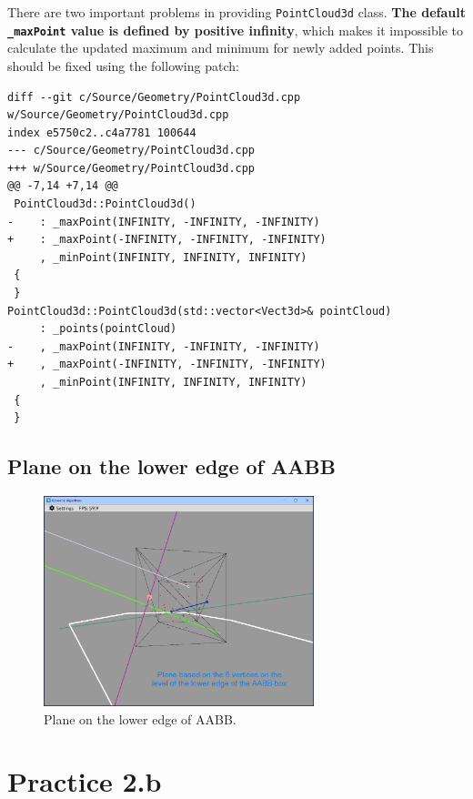 \documentclass[12pt,a4paper,english]{article}
\begin{document}
There are two important problems in providing \lstinline{PointCloud3d} class. \textbf{The default \lstinline{_maxPoint} value is defined by positive infinity}, which makes it impossible to calculate the updated maximum and minimum for newly added points. This should be fixed using the following patch:

\begin{verbatim}
diff --git c/Source/Geometry/PointCloud3d.cpp w/Source/Geometry/PointCloud3d.cpp
index e5750c2..c4a7781 100644
--- c/Source/Geometry/PointCloud3d.cpp
+++ w/Source/Geometry/PointCloud3d.cpp
@@ -7,14 +7,14 @@
 PointCloud3d::PointCloud3d()
-    : _maxPoint(INFINITY, -INFINITY, -INFINITY)
+    : _maxPoint(-INFINITY, -INFINITY, -INFINITY)
     , _minPoint(INFINITY, INFINITY, INFINITY)
 {
 }
PointCloud3d::PointCloud3d(std::vector<Vect3d>& pointCloud)
     : _points(pointCloud)
-    , _maxPoint(INFINITY, -INFINITY, -INFINITY)
+    , _maxPoint(-INFINITY, -INFINITY, -INFINITY)
     , _minPoint(INFINITY, INFINITY, INFINITY)
 {
 }
\end{verbatim}

\subsection{Plane on the lower edge of AABB}

\begin{figure}[H]
    \centering
    \includegraphics[width=0.7\textwidth]{p2a-6}
    \caption[]{Plane on the lower edge of AABB.}
    \label{fig:p2a-6}
\end{figure}

\newpage

\section{Practice 2.b}
\end{document}
